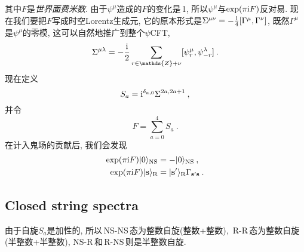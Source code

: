 其中$ F $是{\emph{世界面费米数}}. 由于$ \psi^{\mu} $造成的$ F $的变化是\,1, 所以$ \psi^{\mu} $与$\exp(\pi\mathrm{i} F)$反对易. 现在我们要把$ F $写成时空Lorentz生成元, 它的原本形式是$\Sigma^{\mu\nu}=-\frac{\mathrm{i}}{4}[\Gamma^{\mu},\Gamma^{\nu}]$, 既然$ \Gamma^{\mu} $是$ \psi^{\mu} $的零模, 这可以自然地推广到整个$ \psi $CFT,
\begin{equation}
    \Sigma^{\mu\lambda}=
    -\frac{\mi}{2}\sum_{r\in\mathds{Z}+\nu}[\psi_{r}^{\mu},\psi_{-r}^{\lambda}]\:. \label{10.2.20}
\end{equation}
现在定义
\begin{equation}
    S_{a}=\mathrm{i}^{\delta_{a,0}}\Sigma^{2a,2a+1} \:, \label{102.21}
\end{equation}
并令
\begin{equation}
    F=\sum_{a=0}^{4}S_{a}\:. \label{10.2.22}
\end{equation}
在计入鬼场的贡献后, 我们会发现
\begin{subequations}
\begin{align}
    \exp(\pi\mathrm{i} F)\lvert 0\rangle_{\text{NS}}& =-\lvert 0\rangle_{\text{NS}}\:, \label{10.2.24a} \\
    \exp(\pi\mathrm{i} F)\lvert \mathbf{s}\rangle_{\text{R}}&=\lvert\mathbf{s}^{\prime}\rangle_{\text{R}}\Gamma_{\mathbf{s}^{\prime}\mathbf{s}}\:. \label{10.2.24b}
\end{align} \label{10.2.24}
\end{subequations}

\subsection*{Closed string spectra}
 
由于自旋$S_{a}$是加性的, 所以\,NS-NS\,态为整数自旋(整数+整数), \,R-R\,态为整数自旋(半整数+半整数), NS-R\,和\,R-NS\,则是半整数自旋. 

